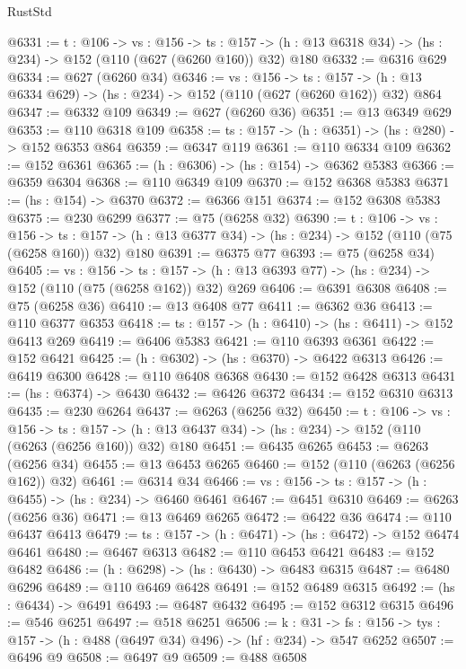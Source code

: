 \begin{lexlean}{RustStd}
\begin{coremodule}
@6331 := {t : @106} ->
  {vs : @156} ->
  {ts : @157} -> (h : @13 @6318 @34) -> (hs : @234) -> @152 (@110 (@627 (@6260 @160)) @32) @180
@6332 := @6316 @629
@6334 := @627 (@6260 @34)
@6346 := {vs : @156} ->
  {ts : @157} -> (h : @13 @6334 @629) -> (hs : @234) -> @152 (@110 (@627 (@6260 @162)) @32) @864
@6347 := @6332 @109
@6349 := @627 (@6260 @36)
@6351 := @13 @6349 @629
@6353 := @110 @6318 @109
@6358 := {ts : @157} -> (h : @6351) -> (hs : @280) -> @152 @6353 @864
@6359 := @6347 @119
@6361 := @110 @6334 @109
@6362 := @152 @6361
@6365 := (h : @6306) -> (hs : @154) -> @6362 @5383
@6366 := @6359 @6304
@6368 := @110 @6349 @109
@6370 := @152 @6368 @5383
@6371 := (hs : @154) -> @6370
@6372 := @6366 @151
@6374 := @152 @6308 @5383
@6375 := @230 @6299
@6377 := @75 (@6258 @32)
@6390 := {t : @106} ->
  {vs : @156} ->
  {ts : @157} -> (h : @13 @6377 @34) -> (hs : @234) -> @152 (@110 (@75 (@6258 @160)) @32) @180
@6391 := @6375 @77
@6393 := @75 (@6258 @34)
@6405 := {vs : @156} ->
  {ts : @157} -> (h : @13 @6393 @77) -> (hs : @234) -> @152 (@110 (@75 (@6258 @162)) @32) @269
@6406 := @6391 @6308
@6408 := @75 (@6258 @36)
@6410 := @13 @6408 @77
@6411 := @6362 @36
@6413 := @110 @6377 @6353
@6418 := {ts : @157} -> (h : @6410) -> (hs : @6411) -> @152 @6413 @269
@6419 := @6406 @5383
@6421 := @110 @6393 @6361
@6422 := @152 @6421
@6425 := (h : @6302) -> (hs : @6370) -> @6422 @6313
@6426 := @6419 @6300
@6428 := @110 @6408 @6368
@6430 := @152 @6428 @6313
@6431 := (hs : @6374) -> @6430
@6432 := @6426 @6372
@6434 := @152 @6310 @6313
@6435 := @230 @6264
@6437 := @6263 (@6256 @32)
@6450 := {t : @106} ->
  {vs : @156} ->
  {ts : @157} -> (h : @13 @6437 @34) -> (hs : @234) -> @152 (@110 (@6263 (@6256 @160)) @32) @180
@6451 := @6435 @6265
@6453 := @6263 (@6256 @34)
@6455 := @13 @6453 @6265
@6460 := @152 (@110 (@6263 (@6256 @162)) @32)
@6461 := @6314 @34
@6466 := {vs : @156} -> {ts : @157} -> (h : @6455) -> (hs : @234) -> @6460 @6461
@6467 := @6451 @6310
@6469 := @6263 (@6256 @36)
@6471 := @13 @6469 @6265
@6472 := @6422 @36
@6474 := @110 @6437 @6413
@6479 := {ts : @157} -> (h : @6471) -> (hs : @6472) -> @152 @6474 @6461
@6480 := @6467 @6313
@6482 := @110 @6453 @6421
@6483 := @152 @6482
@6486 := (h : @6298) -> (hs : @6430) -> @6483 @6315
@6487 := @6480 @6296
@6489 := @110 @6469 @6428
@6491 := @152 @6489 @6315
@6492 := (hs : @6434) -> @6491
@6493 := @6487 @6432
@6495 := @152 @6312 @6315
@6496 := @546 @6251
@6497 := @518 @6251
@6506 := {k : @31} ->
  {fs : @156} -> {tys : @157} -> (h : @488 (@6497 @34) @496) -> (hf : @234) -> @547 @6252
@6507 := @6496 @9
@6508 := @6497 @9
@6509 := @488 @6508

\end{coremodule}
\end{lexlean}
